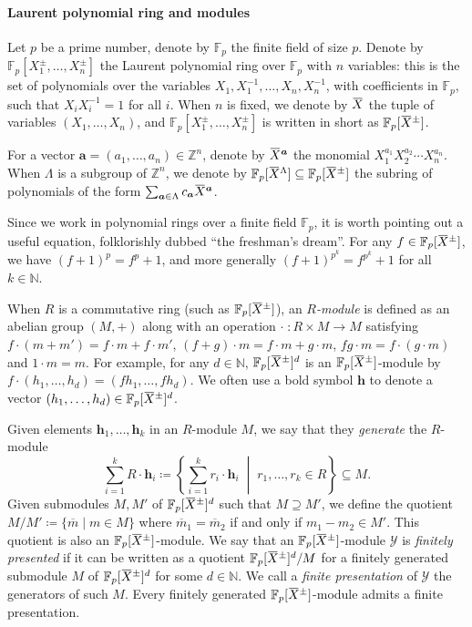\documentclass[a4paper,UKenglish,cleveref, autoref, thm-restate]{lipics-v2021}
\newcommand{\Z}{\mathbb{Z}}
\newcommand{\N}{\mathbb{N}}
\newcommand{\F}{\mathbb{F}}
\newcommand{\mY}{\mathcal{Y}}
\newcommand{\ba}{\boldsymbol{a}}
\newcommand{\bh}{\boldsymbol{h}}
\newcommand{\oX}{\mkern 1.5mu\overline{\mkern-1.5mu X \mkern-1.5mu}\mkern 1.5mu}
\theoremstyle{definition}
\theoremstyle{definition}
\theoremstyle{definition}
\begin{document}
\paragraph*{Laurent polynomial ring and modules}

Let $p$ be a prime number, denote by $\F_p$ the finite field of size $p$.
Denote by $\F_p[X_1^{\pm}, \ldots, X_n^{\pm}]$ the Laurent polynomial ring over $\F_p$ with $n$ variables: this is the set of polynomials over the variables $X_1, X_1^{-1}, \ldots, X_n, X_n^{-1}$, with coefficients in $\F_p$, such that $X_i X_i^{-1} = 1$ for all $i$.
When $n$ is fixed, we denote by $\oX$ the tuple of variables $(X_1, \ldots, X_n)$, and $\F_p[X_1^{\pm}, \ldots, X_n^{\pm}]$ is written in short as $\F_p[\oX^{\pm}]$.

For a vector $\ba = (a_1, \ldots, a_n) \in \Z^n$, denote by $\oX^{\ba}$ the monomial $X_1^{a_1} X_2^{a_2} \cdots X_n^{a_n}$.
When $\Lambda$ is a subgroup of $\Z^n$, we denote by $\F_p[\oX^{\Lambda}] \subseteq \F_p[\oX^{\pm}]$ the subring of polynomials of the form $\sum_{\ba \in \Lambda} c_{\ba} \oX^{\ba}$.

Since we work in polynomial rings over a finite field $\F_p$, it is worth pointing out a useful equation, folklorishly dubbed ``the freshman's dream''. For any $f \in \F_p[\oX^{\pm}]$, we have $(f + 1)^p = f^p + 1$, and more generally $(f + 1)^{p^k} = f^{p^k} + 1$ for all $k \in \N$.

When $R$ is a commutative ring (such as $\F_p[\oX^{\pm}]$), an \emph{$R$-module} is defined as an abelian group $(M, +)$ along with an operation $\cdot \;\colon R \times M \rightarrow M$ satisfying $f \cdot (m+m') = f \cdot m + f \cdot m'$, $(f + g) \cdot m = f \cdot m + g \cdot m$, $fg \cdot m = f \cdot (g \cdot m)$ and $1 \cdot m = m$.
For example, for any $d \in \N$, $\F_p[\oX^{\pm}]^d$ is an $\F_p[\oX^{\pm}]$-module by $f \cdot (h_1, \ldots, h_d) = (fh_1, \ldots, fh_d)$.
We often use a bold symbol $\bh$ to denote a vector $(h_1, \ldots, h_d) \in \F_p[\oX^{\pm}]^d$.

Given elements $\bh_1, \ldots, \bh_k$ in an $R$-module $M$, we say that they \emph{generate} the $R$-module
\[ \sum_{i=1}^k R \cdot \bh_i \coloneqq \left\{\sum_{i=1}^k r_i \cdot \bh_i \;\middle|\; r_1, \ldots, r_k \in R \right\} \subseteq M. \]
Given submodules $M, M'$ of $\F_p[\oX^{\pm}]^d$ such that $M \supseteq M'$, we define the quotient $M/M' \coloneqq \{\overline{m} \mid m \in M\}$ where $\overline{m}_1 = \overline{m}_2$ if and only if $m_1 - m_2 \in M'$.
This quotient is also an $\F_p[\oX^{\pm}]$-module.
We say that an $\F_p[\oX^{\pm}]$-module $\mY$ is \emph{finitely presented} if it can be written as a quotient $\F_p[\oX^{\pm}]^d/M$ for a finitely generated submodule $M$ of $\F_p[\oX^{\pm}]^d$ for some $d \in \N$.
We call a \emph{finite presentation} of $\mY$ the generators of such $M$.
Every finitely generated $\F_p[\oX^{\pm}]$-module admits a finite presentation.
\end{document}
